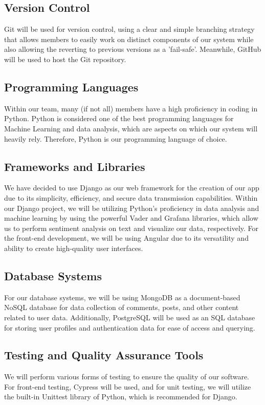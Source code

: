 \documentclass[12pt]{article}
\begin{document}
\subsection{Version Control}
Git will be used for version control, using a clear and simple branching strategy that allows members to easily work on distinct components of our system while also allowing the reverting to previous versions as a 'fail-safe'. Meanwhile, GitHub will be used to host the Git repository.

\subsection{Programming Languages}
Within our team, many (if not all) members have a high proficiency in coding in Python. Python is considered one of the best programming languages for Machine Learning and data analysis, which are aspects on which our system will heavily rely. Therefore, Python is our programming language of choice.

\subsection{Frameworks and Libraries}
We have decided to use Django as our web framework for the creation of our app due to its simplicity, efficiency, and secure data transmission capabilities. Within our Django project, we will be utilizing Python's proficiency in data analysis and machine learning by using the powerful Vader and Grafana libraries, which allow us to perform sentiment analysis on text and visualize our data, respectively. For the front-end development, we will be using Angular due to its versatility and ability to create high-quality user interfaces.

\subsection{Database Systems}
For our database systems, we will be using MongoDB as a document-based NoSQL database for data collection of comments, posts, and other content related to user data. Additionally, PostgreSQL will be used as an SQL database for storing user profiles and authentication data for ease of access and querying.

\subsection{Testing and Quality Assurance Tools}
We will perform various forms of testing to ensure the quality of our software. For front-end testing, Cypress will be used, and for unit testing, we will utilize the built-in Unittest library of Python, which is recommended for Django.
\end{document}
